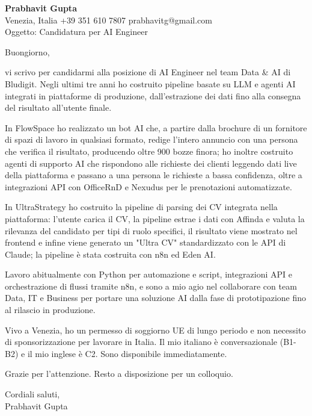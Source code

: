 \documentclass[a4paper,10.5pt]{article}
\begin{document}
\textbf{Prabhavit Gupta}\\
Venezia, Italia \textbar{} +39 351 610 7807 \textbar{} prabhavitg@gmail.com\\[10pt]
Oggetto: Candidatura per AI Engineer

Buongiorno,

vi scrivo per candidarmi alla posizione di AI Engineer nel team Data \& AI di Bludigit. Negli ultimi tre anni ho costruito pipeline basate su LLM e agenti AI integrati in piattaforme di produzione, dall'estrazione dei dati fino alla consegna del risultato all'utente finale.

In FlowSpace ho realizzato un bot AI che, a partire dalla brochure di un fornitore di spazi di lavoro in qualsiasi formato, redige l'intero annuncio con una persona che verifica il risultato, producendo oltre 900 bozze finora; ho inoltre costruito agenti di supporto AI che rispondono alle richieste dei clienti leggendo dati live della piattaforma e passano a una persona le richieste a bassa confidenza, oltre a integrazioni API con OfficeRnD e Nexudus per le prenotazioni automatizzate.

In UltraStrategy ho costruito la pipeline di parsing dei CV integrata nella piattaforma: l'utente carica il CV, la pipeline estrae i dati con Affinda e valuta la rilevanza del candidato per tipi di ruolo specifici, il risultato viene mostrato nel frontend e infine viene generato un "Ultra CV" standardizzato con le API di Claude; la pipeline è stata costruita con n8n ed Eden AI.

Lavoro abitualmente con Python per automazione e script, integrazioni API e orchestrazione di flussi tramite n8n, e sono a mio agio nel collaborare con team Data, IT e Business per portare una soluzione AI dalla fase di prototipazione fino al rilascio in produzione.

Vivo a Venezia, ho un permesso di soggiorno UE di lungo periodo e non necessito di sponsorizzazione per lavorare in Italia. Il mio italiano è conversazionale (B1-B2) e il mio inglese è C2. Sono disponibile immediatamente.

Grazie per l'attenzione. Resto a disposizione per un colloquio.

Cordiali saluti,\\
Prabhavit Gupta
\end{document}
